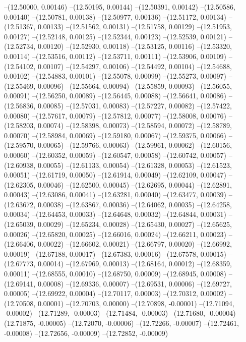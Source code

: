 --(12.50000, 0.00146)
--(12.50195, 0.00144)
--(12.50391, 0.00142)
--(12.50586, 0.00140)
--(12.50781, 0.00138)
--(12.50977, 0.00136)
--(12.51172, 0.00134)
--(12.51367, 0.00133)
--(12.51562, 0.00131)
--(12.51758, 0.00129)
--(12.51953, 0.00127)
--(12.52148, 0.00125)
--(12.52344, 0.00123)
--(12.52539, 0.00121)
--(12.52734, 0.00120)
--(12.52930, 0.00118)
--(12.53125, 0.00116)
--(12.53320, 0.00114)
--(12.53516, 0.00112)
--(12.53711, 0.00111)
--(12.53906, 0.00109)
--(12.54102, 0.00107)
--(12.54297, 0.00106)
--(12.54492, 0.00104)
--(12.54688, 0.00102)
--(12.54883, 0.00101)
--(12.55078, 0.00099)
--(12.55273, 0.00097)
--(12.55469, 0.00096)
--(12.55664, 0.00094)
--(12.55859, 0.00093)
--(12.56055, 0.00091)
--(12.56250, 0.00089)
--(12.56445, 0.00088)
--(12.56641, 0.00086)
--(12.56836, 0.00085)
--(12.57031, 0.00083)
--(12.57227, 0.00082)
--(12.57422, 0.00080)
--(12.57617, 0.00079)
--(12.57812, 0.00077)
--(12.58008, 0.00076)
--(12.58203, 0.00074)
--(12.58398, 0.00073)
--(12.58594, 0.00072)
--(12.58789, 0.00070)
--(12.58984, 0.00069)
--(12.59180, 0.00067)
--(12.59375, 0.00066)
--(12.59570, 0.00065)
--(12.59766, 0.00063)
--(12.59961, 0.00062)
--(12.60156, 0.00060)
--(12.60352, 0.00059)
--(12.60547, 0.00058)
--(12.60742, 0.00057)
--(12.60938, 0.00055)
--(12.61133, 0.00054)
--(12.61328, 0.00053)
--(12.61523, 0.00051)
--(12.61719, 0.00050)
--(12.61914, 0.00049)
--(12.62109, 0.00047)
--(12.62305, 0.00046)
--(12.62500, 0.00045)
--(12.62695, 0.00044)
--(12.62891, 0.00043)
--(12.63086, 0.00041)
--(12.63281, 0.00040)
--(12.63477, 0.00039)
--(12.63672, 0.00038)
--(12.63867, 0.00036)
--(12.64062, 0.00035)
--(12.64258, 0.00034)
--(12.64453, 0.00033)
--(12.64648, 0.00032)
--(12.64844, 0.00031)
--(12.65039, 0.00029)
--(12.65234, 0.00028)
--(12.65430, 0.00027)
--(12.65625, 0.00026)
--(12.65820, 0.00025)
--(12.66016, 0.00024)
--(12.66211, 0.00023)
--(12.66406, 0.00022)
--(12.66602, 0.00021)
--(12.66797, 0.00020)
--(12.66992, 0.00019)
--(12.67188, 0.00017)
--(12.67383, 0.00016)
--(12.67578, 0.00015)
--(12.67773, 0.00014)
--(12.67969, 0.00013)
--(12.68164, 0.00012)
--(12.68359, 0.00011)
--(12.68555, 0.00010)
--(12.68750, 0.00009)
--(12.68945, 0.00008)
--(12.69141, 0.00008)
--(12.69336, 0.00007)
--(12.69531, 0.00006)
--(12.69727, 0.00005)
--(12.69922, 0.00004)
--(12.70117, 0.00003)
--(12.70312, 0.00002)
--(12.70508, 0.00001)
--(12.70703, 0.00000)
--(12.70898, -0.00001)
--(12.71094, -0.00002)
--(12.71289, -0.00003)
--(12.71484, -0.00003)
--(12.71680, -0.00004)
--(12.71875, -0.00005)
--(12.72070, -0.00006)
--(12.72266, -0.00007)
--(12.72461, -0.00008)
--(12.72656, -0.00009)
--(12.72852, -0.00009)
